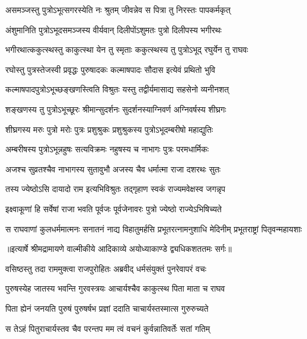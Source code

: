 \twolineshloka
{असमञ्जस्तु पुत्रोऽभूत्सगरस्येति नः श्रुतम्}
{जीवन्नेव स पित्रा तु निरस्तः पापकर्मकृत्} %

\twolineshloka
{अंशुमानिति पुत्रोऽभूदसमञ्जस्य वीर्यवान्}
{दिलीपोंऽशुमतः पुत्रो दिलीपस्य भगीरथः} %

\twolineshloka
{भगीरथात्ककुत्स्थस्तु काकुत्स्था येन तु स्मृताः}
{ककुत्स्थस्य तु पुत्रोऽभूद् रघुर्येन तु राघवः} %

\twolineshloka
{रघोस्तु पुत्रस्तेजस्वी प्रवृद्धः पुरुषादकः}
{कल्माषपादः सौदास इत्येवं प्रथितो भुवि} %

\twolineshloka
{कल्माषपादपुत्रोऽभूच्छङ्खणस्त्विति विश्रुतः}
{यस्तु तद्वीर्यमासाद्य सहसेनो व्यनीनशत्} %

\twolineshloka
{शङ्खणस्य तु पुत्रोऽभूच्छूरः श्रीमान्सुदर्शनः}
{सुदर्शनस्याग्निवर्ण अग्निवर्षस्य शीघ्रगः} %

\twolineshloka
{शीघ्रगस्य मरुः पुत्रो मरोः पुत्रः प्रशुश्रुकः}
{प्रशुश्रुकस्य पुत्रोऽभूदम्बरीषो महाद्युतिः} %

\twolineshloka
{अम्बरीषस्य पुत्रोऽभून्नहुषः सत्यविक्रमः}
{नहुषस्य च नाभागः पुत्रः परमधार्मिकः} %

\twolineshloka
{अजश्च सुव्रतश्चैव नाभागस्य सुतावुभौ}
{अजस्य चैव धर्मात्मा राजा दशरथः सुतः} %

\twolineshloka
{तस्य ज्येष्ठोऽसि दायादो राम इत्यभिविश्रुतः}
{तद्गृहाण स्वकं राज्यमवेक्षस्व जगन्नृप} %

\twolineshloka
{इक्ष्वाकूणां हि सर्वेषां राजा भवति पूर्वजः}
{पूर्वजेनावरः पुत्रो ज्येष्ठो राज्येऽभिषिच्यते} %

\fourlineindentedshloka
{स राघवाणां कुलधर्ममात्मनः}
{सनातनं नाद्य विहातुमर्हसि}
{प्रभूतरत्नामनुशाधि मेदिनीम्}
{प्रभूतराष्ट्रां पितृवन्महायशाः} %


{॥इत्यार्षे श्रीमद्रामायणे वाल्मीकीये आदिकाव्ये अयोध्याकाण्डे द्व्यधिकशततमः सर्गः॥}


\twolineshloka
{वसिष्ठस्तु तदा राममुक्त्वा राजपुरोहितः}
{अब्रवीद् धर्मसंयुक्तं पुनरेवापरं वचः} %

\twolineshloka
{पुरुषस्येह जातस्य भवन्ति गुरवस्त्रयः}
{आचार्यश्चैव काकुत्स्थ पिता माता च राघव} %

\twolineshloka
{पिता ह्येनं जनयति पुरुषं पुरुषर्षभ}
{प्रज्ञां ददाति चाचार्यस्तस्मात्स गुरुरुच्यते} %

\twolineshloka
{स तेऽहं पितुराचार्यस्तव चैव परन्तप}
{मम त्वं वचनं कुर्वन्नातिवर्तेः सतां गतिम्} %

